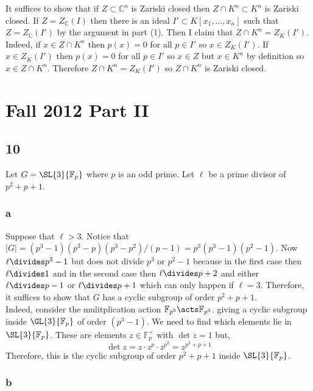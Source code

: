 \documentclass[12pt]{article}
\renewcommand{\C}{\mathbb{C}}
\renewcommand{\F}{\mathbb{F}}
\begin{document}
It suffices to show that if $Z \subset \C^n$ is Zariski closed then $Z \cap K^n \subset K^n$ is Zariski closed. If $Z = Z_{\C}(I)$ then there is an ideal $I' \subset K[x_1, \dots, x_n]$ such that $Z = Z_{\C}(I')$ by the argument in part (1). Then I claim that $Z \cap K^n = Z_{K}(I')$. Indeed, if $x \in Z \cap K^n$ then $p(x) = 0$ for all $p \in I'$ so $x \in Z_K(I')$. If $x \in Z_K(I')$ then $p(x) = 0$ for all $p \in I'$ so $x \in Z$ but $x \in K^n$ by definition so $x \in Z \cap K^n$. Therefore $Z \cap K^n = Z_K(I')$ so $Z \cap K^n$ is Zariski closed.

\section{Fall 2012 Part II}



\subsection{10}

Let $G = \SL{3}{\F_p}$ where $p$ is an odd prime. Let $\ell$ be a prime divisor of $p^2 + p + 1$.

\subsubsection{a}

Suppose that $\ell > 3$. Notice that $|G| = (p^3 - 1)(p^3 - p)(p^3 - p^2) / (p-1) = p^3 (p^3 - 1)(p^2 - 1)$. Now $\ell \divides p^3 - 1$ but does not divide $p^3$ or $p^2 - 1$ because in the first case then $\ell \divides 1$ and in the second case then $\ell \divides p + 2$ and either $\ell \divides p - 1$ or $\ell \divides p + 1$ which can only happen if $\ell  = 3$. Therefore, it suffices to show that $G$ has a cyclic subgroup of order $p^2 + p + 1$.
\bigskip\\
Indeed, consider the mulitplication action $\F_{p^3} \acts \F_{p^3}$. giving a cyclic subgroup inside $\GL{3}{\F_p}$ of order $(p^3 - 1)$. We need to find which elements lie in $\SL{3}{\F_p}$. These are elements $z \in \F_p^\times$ with $\det{z} = 1$ but,
\[ \det{z} = z \cdot z^p \cdot z^{p^2} = z^{p^2 + p + 1} \] 
Therefore, this is the cyclic subgroup of order $p^2 + p + 1$ inside $\SL{3}{\F_p}$. 


\subsubsection{b}
\end{document}
